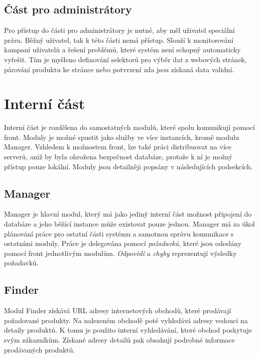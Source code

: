 \documentclass[thesis=B,czech]{FITthesis}[2012/06/26]
\begin{document}
\subsection{Část pro administrátory}
Pro přístup do části pro administrátory je nutné, aby měl uživatel speciální práva. Běžný uživatel, tak k této části nemá přístup. Slouží k monitorování kampaní uživatelů a řešení problémů, které systém není schopný 
automaticky vyřešit. Tím je myšleno definování selektorů pro výběr dat z webových stránek, párování produktu ke stránce 
nebo potvrzení zda jsou získaná data validní.

\section{Interní část}
Interní část je rozdělena do samostatných modulů, které spolu komunikují pomocí front. Moduly je možné spustit jako služby ve více 
instancích, kromě modulu Manager. Vzhledem k možnostem front, lze také práci distribuovat na více serverů, aniž by byla ohrožena 
bezpečnost databáze, protože k ní je možný přístup pouze lokální. Moduly jsou detailněji popsány v následujících podsekcích.
\subsection{Manager}
Manager je hlavní modul, který má jako jediný interní část možnost připojení do databáze a jeho běžící instance může existovat pouze jednou.
Manager má za úkol plánování práce pro ostatní části systému a samotnou správu komunikace s ostatními moduly. Práce je delegována pomocí
\textit{požadavků}, které jsou odeslány pomocí front jednotlivým modulům. \textit{Odpovědí} a \textit{chyby} reprezentují výsledky požadavků.
\subsection{Finder}
Modul Finder získává URL adresy internetových obchodů, které prodávají požadované produkty.
Na nalezeném obchodě poté vyhledává adresy vedoucí na detaily produktů. K tomu je použito interní vyhledávání, které
obchod poskytuje svým zákazníkům. Získané adresy detailů pak obsahují podrobné informace prodávaných produktů.
\end{document}
